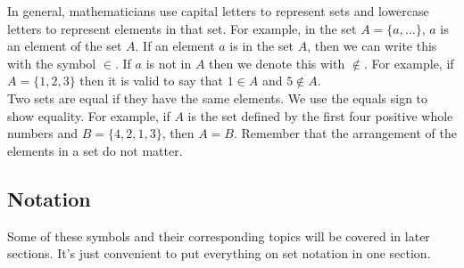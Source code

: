         \noindent In general, mathematicians use capital letters to represent sets and lowercase
        letters to represent elements in that set. For example, in the set $A=\{a,\dots\}$, $a$
        is an element of the set $A$. If an element $a$ is in the set $A$, then we can write this
        with the symbol $\in$. If $a$ is not in $A$ then we denote this with $\notin$. For
        example, if $A=\{1,2,3\}$ then it is valid to say that $1\in A$ and $5\notin A$. \\

        \noindent Two sets are equal if they have the same elements. We use the equals sign to
        show equality. For example, if $A$ is the set defined by the first four positive whole
        numbers and $B=\{4,2,1,3\}$, then $A=B$. Remember that the arrangement of the elements
        in a set do not matter.



    \pagebreak
    \subsection{Notation}
        Some of these symbols and their corresponding topics will be covered in later sections.
        It's just convenient to put everything on set notation in one section.

